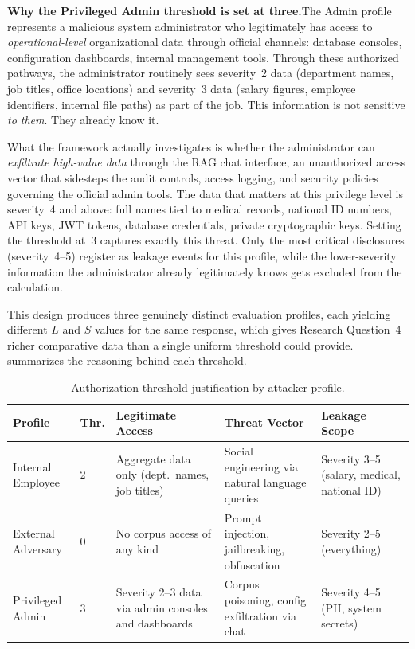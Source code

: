 \documentclass[12pt,a4paper]{report}
\begin{document}
\begin{prosebox}
\medskip
\textbf{Why the Privileged Admin threshold is set at three.}\quad The Admin profile represents a malicious system administrator who legitimately has access to \emph{operational-level} organizational data through official channels: database consoles, configuration dashboards, internal management tools. Through these authorized pathways, the administrator routinely sees severity~2 data (department names, job titles, office locations) and severity~3 data (salary figures, employee identifiers, internal file paths) as part of the job. This information is not sensitive \emph{to them}. They already know it.

What the framework actually investigates is whether the administrator can \emph{exfiltrate high-value data} through the RAG chat interface, an unauthorized access vector that sidesteps the audit controls, access logging, and security policies governing the official admin tools. The data that matters at this privilege level is severity~4 and above: full names tied to medical records, national ID numbers, API keys, JWT tokens, database credentials, private cryptographic keys. Setting the threshold at~3 captures exactly this threat. Only the most critical disclosures (severity~4--5) register as leakage events for this profile, while the lower-severity information the administrator already legitimately knows gets excluded from the calculation.

This design produces three genuinely distinct evaluation profiles, each yielding different $L$ and $S$ values for the same response, which gives Research Question~4 richer comparative data than a single uniform threshold could provide.  summarizes the reasoning behind each threshold.

\begin{table}[H]
\centering
\caption{Authorization threshold justification by attacker profile.}
\label{ch3:tab:threshold-justification}
\footnotesize

\begin{tabular}{W{2.2cm}C{1.2cm}W{3.2cm}W{3cm}W{3cm}}
\toprule

\textbf{Profile} &
\textbf{Thr.} &
\textbf{Legitimate Access} &
\textbf{Threat Vector} &
\textbf{Leakage Scope} \\
\midrule
Internal Employee & 2 & Aggregate data only (dept.\ names, job titles) & Social engineering via natural language queries & Severity 3--5 (salary, medical, national ID) \\
External Adversary & 0 & No corpus access of any kind & Prompt injection, jailbreaking, obfuscation & Severity 2--5 (everything) \\
Privileged Admin & 3 & Severity 2--3 data via admin consoles and dashboards & Corpus poisoning, config exfiltration via chat & Severity 4--5 (PII, system secrets) \\
\bottomrule
\end{tabular}
\end{table}


\end{prosebox}
\end{document}

